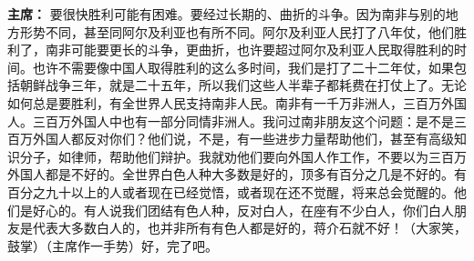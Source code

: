 \begin{list}{}
\item[\textbf{主席：}] 要很快胜利可能有困难。要经过长期的、曲折的斗争。因为南非与别的地方形势不同，甚至同阿尔及利亚也有所不同。阿尔及利亚人民打了八年仗，他们胜利了，南非可能要更长的斗争，更曲折，也许要超过阿尔及利亚人民取得胜利的时间。也许不需要像中国人取得胜利的这么多时间，我们是打了二十二年仗，如果包括朝鲜战争三年，就是二十五年，所以我们这些人半辈子都耗费在打仗上了。无论如何总是要胜利，有全世界人民支持南非人民。南非有一千万非洲人，三百万外国人。三百万外国人中也有一部分同情非洲人。我问过南非朋友这个问题：是不是三百万外国人都反对你们？他们说，不是，有一些进步力量帮助他们，甚至有高级知识分子，如律师，帮助他们辩护。我就劝他们要向外国人作工作，不要以为三百万外国人都是不好的。全世界白色人种大多数是好的，顶多有百分之几是不好的。有百分之九十以上的人或者现在已经觉悟，或者现在还不觉醒，将来总会觉醒的。他们是好心的。有人说我们团结有色人种，反对白人，在座有不少白人，你们白人朋友是代表大多数白人的，也并非所有有色人都是好的，蒋介石就不好！（大家笑，鼓掌）（主席作一手势）好，完了吧。


\end{list}